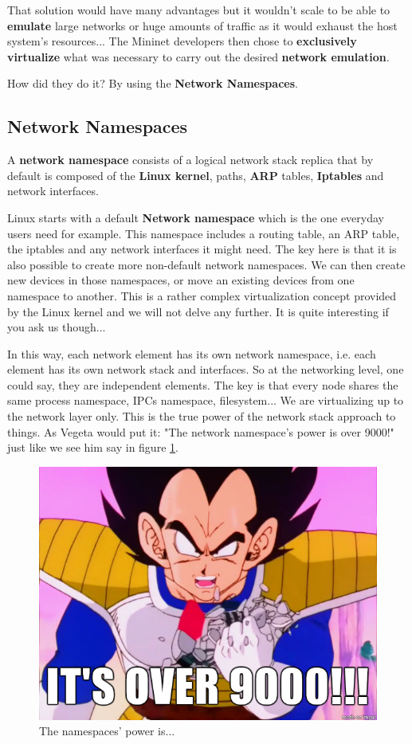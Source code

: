 \documentclass[12pt]{article}
\newcommand{\newpar} {
    \vskip 1cm
}
\begin{document}
	\newpar
	That solution would have many advantages but it wouldn't scale to be able to \textbf{emulate} large networks or huge amounts of traffic as it would exhaust the host system's resources... The Mininet developers then chose to \textbf{exclusively virtualize} what was necessary to carry out the desired \textbf{network emulation}.
	\newpar
	How did they do it? By using the \textbf{Network Namespaces}.

	\subsection{Network Namespaces}
		A \textbf{network namespace} consists of a logical network stack replica that by default is composed of the \textbf{Linux kernel}, paths, \textbf{ARP} tables, \textbf{Iptables} and network interfaces.
		\newpar
		Linux starts with a default \textbf{Network namespace} which is the one everyday users need for example. This namespace includes a routing table, an ARP table, the iptables and any network interfaces it might need. The key here is that it is also possible to create more non-default network namespaces. We can then create new devices in those namespaces, or move an existing devices from one namespace to another. This is a rather complex virtualization concept provided by the Linux kernel and we will not delve any further. It is quite interesting if you ask us though...
		\newpar
		In this way, each network element has its own network namespace, i.e. each element has its own network stack and interfaces. So at the networking level, one could say, they are independent elements. The key is that every node shares the same process namespace, IPCs namespace, filesystem... We are virtualizing up to the network layer only. This is the true power of the network stack approach to things. As Vegeta would put it: "The network namespace's power is over 9000!" just like we see him say in figure \ref{f:ns_power}.

		\begin{figure}[!htb]
			\centering
			\includegraphics[width=0.6\linewidth]{vegeta.png}
			\caption{The namespaces' power is...}
			\label{f:ns_power}
		\end{figure}
        
\end{document}
